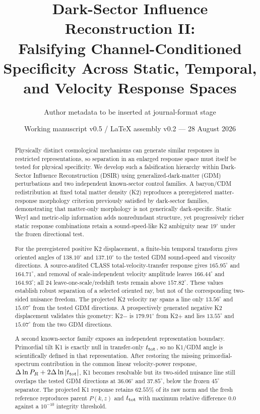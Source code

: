 \documentclass[11pt]{article}
\title{Dark-Sector Influence Reconstruction II:\\Falsifying Channel-Conditioned Specificity Across Static, Temporal, and Velocity Response Spaces}
\author{Author metadata to be inserted at journal-format stage}
\date{Working manuscript v0.5 / LaTeX assembly v0.2 --- 28 August 2026}
\newcommand{\ttot}{t_{\rm tot}}
\newcommand{\dln}{\Delta\ln}
\begin{document}
\maketitle

\begin{abstract}
Physically distinct cosmological mechanisms can generate similar responses in restricted representations, so separation in an enlarged response space must itself be tested for physical specificity. We develop such a falsification hierarchy within Dark-Sector Influence Reconstruction (DSIR) using generalized-dark-matter (GDM) perturbations and two independent known-sector control families. A baryon/CDM redistribution at fixed total matter density (K2) reproduces a preregistered matter-response morphology criterion previously satisfied by dark-sector families, demonstrating that matter-only morphology is not generically dark-specific. Static Weyl and metric-slip information adds nonredundant structure, yet progressively richer static response combinations retain a sound-speed-like K2 ambiguity near $19^\circ$ under the frozen directional test.

For the preregistered positive K2 displacement, a finite-bin temporal transform gives oriented angles of $138.10^\circ$ and $137.10^\circ$ to the tested GDM sound-speed and viscosity directions. A source-audited CLASS total-velocity-transfer response gives $165.95^\circ$ and $164.71^\circ$, and removal of scale-independent velocity amplitude leaves $166.44^\circ$ and $164.93^\circ$; all 24 leave-one-scale/redshift tests remain above $157.82^\circ$. These values establish robust separation of a selected oriented ray, but not of the corresponding two-sided nuisance freedom. The projected K2 velocity ray spans a line only $13.56^\circ$ and $15.07^\circ$ from the tested GDM directions. A prospectively generated negative K2 displacement validates this geometry: K2$-$ is $179.91^\circ$ from K2$+$ and lies $13.55^\circ$ and $15.07^\circ$ from the two GDM directions.

A second known-sector family exposes an independent representation boundary. Primordial tilt K1 is exactly null in transfer-only $\ttot$, so no K1/GDM angle is scientifically defined in that representation. After restoring the missing primordial-spectrum contribution in the common linear velocity-power response, $\dln P_R+2\dln|\ttot|$, K1 becomes resolvable but its two-sided nuisance line still overlaps the tested GDM directions at $36.06^\circ$ and $37.85^\circ$, below the frozen $45^\circ$ separator. The projected K1 response retains $62.55\%$ of its raw norm and the fresh reference reproduces parent $P(k,z)$ and $\ttot$ with maximum relative difference $0.0$ against a $10^{-10}$ integrity threshold.


\end{abstract}
\end{document}
